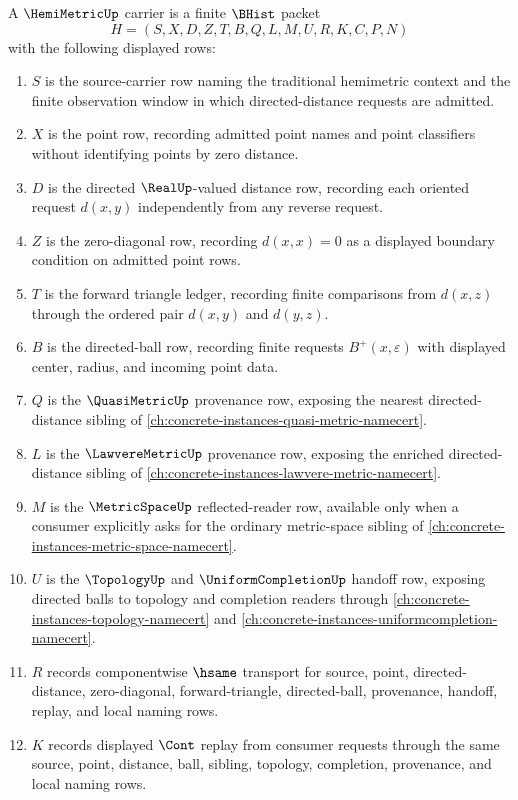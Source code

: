 \begin{definition}
\label{def:hemimetric-carrier}
A $\HemiMetricUp$ carrier is a finite $\BHist$ packet
$$
H=(S,X,D,Z,T,B,Q,L,M,U,R,K,C,P,N)
$$
with the following displayed rows:
\begin{enumerate}
\item $S$ is the source-carrier row naming the traditional hemimetric context and the finite observation window in which directed-distance requests are admitted.
\item $X$ is the point row, recording admitted point names and point classifiers without identifying points by zero distance.
\item $D$ is the directed $\RealUp$-valued distance row, recording each oriented request $d(x,y)$ independently from any reverse request.
\item $Z$ is the zero-diagonal row, recording $d(x,x)=0$ as a displayed boundary condition on admitted point rows.
\item $T$ is the forward triangle ledger, recording finite comparisons from $d(x,z)$ through the ordered pair $d(x,y)$ and $d(y,z)$.
\item $B$ is the directed-ball row, recording finite requests $B^+(x,\varepsilon)$ with displayed center, radius, and incoming point data.
\item $Q$ is the $\QuasiMetricUp$ provenance row, exposing the nearest directed-distance sibling of \autoref{ch:concrete-instances-quasi-metric-namecert}.
\item $L$ is the $\LawvereMetricUp$ provenance row, exposing the enriched directed-distance sibling of \autoref{ch:concrete-instances-lawvere-metric-namecert}.
\item $M$ is the $\MetricSpaceUp$ reflected-reader row, available only when a consumer explicitly asks for the ordinary metric-space sibling of \autoref{ch:concrete-instances-metric-space-namecert}.
\item $U$ is the $\TopologyUp$ and $\UniformCompletionUp$ handoff row, exposing directed balls to topology and completion readers through \autoref{ch:concrete-instances-topology-namecert} and \autoref{ch:concrete-instances-uniformcompletion-namecert}.
\item $R$ records componentwise $\hsame$ transport for source, point, directed-distance, zero-diagonal, forward-triangle, directed-ball, provenance, handoff, replay, and local naming rows.
\item $K$ records displayed $\Cont$ replay from consumer requests through the same source, point, distance, ball, sibling, topology, completion, provenance, and local naming rows.

\end{enumerate}
\end{definition}
